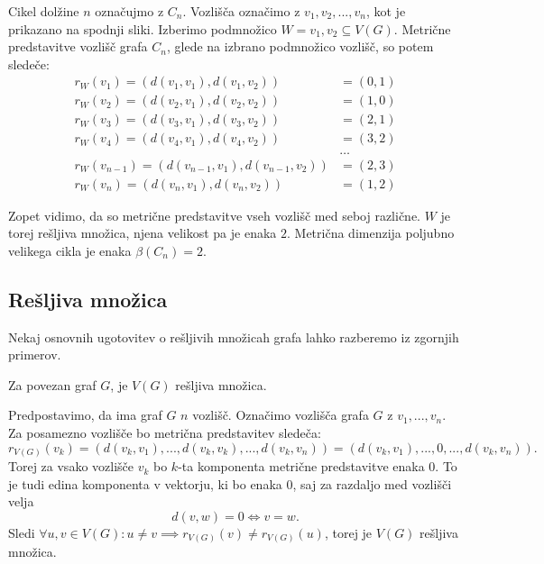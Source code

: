 \documentclass[mat1, tisk]{fmfdelo}
\begin{document}
\begin{primer}\label{primer_2.5.}
    Cikel dolžine $n$ označujmo z $C_n$. Vozlišča označimo z $v_1, v_2, ..., v_n$, kot 
    je prikazano na spodnji sliki. Izberimo podmnožico $W = {v_1, v_2} \subseteq V(G).$ 
    Metrične predstavitve vozlišč grafa $C_n$, glede na izbrano podmnožico vozlišč, so potem sledeče:
    \begin{align*}
        r_W(v_1) = (d(v_1, v_1), d(v_1, v_2)) & = (0, 1) \\
        r_W(v_2) = (d(v_2, v_1), d(v_2, v_2)) & = (1, 0) \\
        r_W(v_3) = (d(v_3, v_1), d(v_3, v_2)) & = (2, 1) \\
        r_W(v_4) = (d(v_4, v_1), d(v_4, v_2)) & = (3, 2) \\
        & \dots \\
        r_W(v_{n-1}) = (d(v_{n-1}, v_1), d(v_{n-1}, v_2)) & = (2, 3) \\
        r_W(v_n) = (d(v_n, v_1), d(v_n, v_2)) & = (1, 2)
    \end{align*}
    
    Zopet vidimo, da so metrične predstavitve vseh vozlišč med seboj različne.
    $W$  je torej rešljiva množica, njena velikost pa je enaka $2$. Metrična dimenzija
    poljubno velikega cikla je enaka $\beta(C_n) = 2.$
\end{primer}

\subsection{Rešljiva množica}

Nekaj osnovnih ugotovitev o rešljivih množicah grafa lahko razberemo iz zgornjih primerov.

\begin{trditev}
Za povezan graf $G$, je $V(G)$ rešljiva množica.
\end{trditev}
\begin{dokaz}
Predpostavimo, da ima graf $G$ $n$ vozlišč. Označimo vozlišča grafa $G$ z $v_1, ..., v_n$.
Za posamezno vozlišče bo metrična predstavitev sledeča:
$$r_{V(G)}(v_k) = (d(v_k, v_1), ..., d(v_k, v_k), ... , d(v_k, v_n)) = (d(v_k, v_1), ..., 0 , ... , d(v_k, v_n)).$$
Torej za vsako vozlišče $v_k$ bo $k$-ta komponenta metrične predstavitve enaka $0$. To je tudi edina komponenta v vektorju, 
ki bo enaka $0$, saj za razdaljo med vozlišči velja
$$d(v, w) = 0 \Leftrightarrow v = w.$$
Sledi $\forall u, v \in V(G): u \neq v \implies r_{V(G)}(v) \neq r_{V(G)}(u)$, torej je $V(G)$ rešljiva množica.
\end{dokaz}
\end{document}
